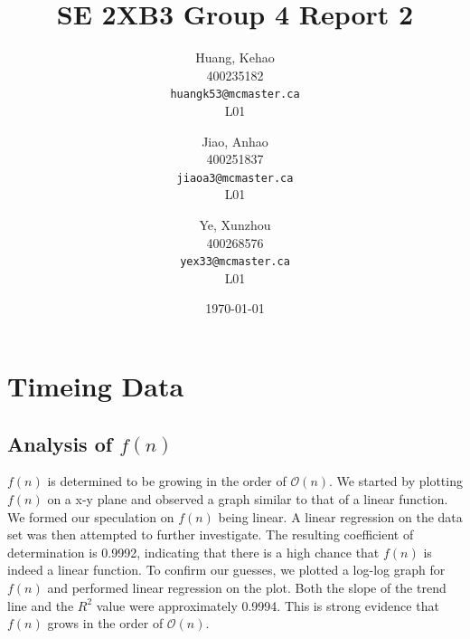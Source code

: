 \documentclass[titlepage, 12pt]{article}
\title{SE 2XB3 Group 4 Report 2}
\author{
  Huang, Kehao \\
  400235182 \\
  \texttt{huangk53@mcmaster.ca} \\
  L01
  \and
  Jiao, Anhao \\
  400251837 \\
  \texttt{jiaoa3@mcmaster.ca} \\
  L01
  \and
  Ye, Xunzhou \\
  400268576 \\
  \texttt{yex33@mcmaster.ca} \\
  L01
}
\date{\today}
\begin{document}
\maketitle{}

\newpage{}

\section{Timeing Data}

\subsection{Analysis of $f(n)$}

$f(n)$ is determined to be growing in the order of $\mathcal{O}(n)$. We started by 
plotting $f(n)$ on a x-y plane and observed a graph similar to that of 
a linear function. We formed our speculation on $f(n)$ being linear. A 
linear regression on the data set was then attempted to further 
investigate. The resulting coefficient of determination is 0.9992, 
indicating that there is a high chance that $f(n)$ is indeed a linear 
function. To confirm our guesses, we plotted a log-log graph for $f(n)$ 
and performed linear regression on the plot. Both the slope of the trend 
line and the $R^{2}$ value were approximately 0.9994. This 
is strong evidence that $f(n)$ grows in the order of $\mathcal{O}(n)$.
\end{document}
